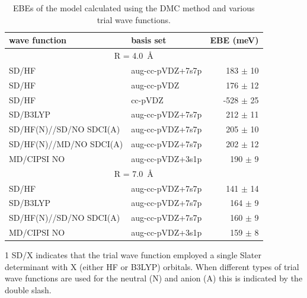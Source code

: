\begin{table}
    \begin{threeparttable}
        \caption{\label{tab:DMC} EBEs of the  model calculated using the DMC method and various trial wave functions.}
    \begin{tabular}{llr}
wave function                  & basis set        &  EBE (meV) \\ \hline
\multicolumn{3}{c}{R = \SI{4.0}{\angstrom}}               \\ 
SD/HF                         & aug-cc-pVDZ+7s7p &  183 $\pm$ 10 \\
SD/HF                         & aug-cc-pVDZ      &  176 $\pm$ 12 \\
SD/HF                         & cc-pVDZ          & -528 $\pm$ 25 \\ 
SD/B3LYP                      & aug-cc-pVDZ+7s7p &  212 $\pm$ 11 \\
SD/HF(N)//SD/NO SDCI(A)    & aug-cc-pVDZ+7s7p &  205 $\pm$ 10 \\
SD/HF(N)//MD/NO SDCI(A)    & aug-cc-pVDZ+7s7p &  202 $\pm$ 12 \\
MD/CIPSI NO                   & aug-cc-pVDZ+3s1p &  190 $\pm$ 9  \\ \hline
\multicolumn{3}{c}{R = \SI{7.0}{\angstrom}}                    \\ 
SD/HF                         & aug-cc-pVDZ+7s7p &   141 $\pm$ 14 \\ 
SD/B3LYP                      & aug-cc-pVDZ+7s7p &   164 $\pm$ 9 \\
SD/HF(N)//SD/NO SDCI(A)    & aug-cc-pVDZ+7s7p &  160 $\pm$ 9 \\
MD/CIPSI NO                   & aug-cc-pVDZ+3s1p &    159 $\pm$ 8 \\
\end{tabular}
\begin{tablenotes}
  \item [1] SD/X indicates that the trial wave function employed a single Slater determinant with X (either HF or B3LYP) orbitals. When different types of trial wave functions are used for the neutral (N) and anion (A) this is indicated by the double slash.
\end{tablenotes}
\end{threeparttable}
\end{table}

